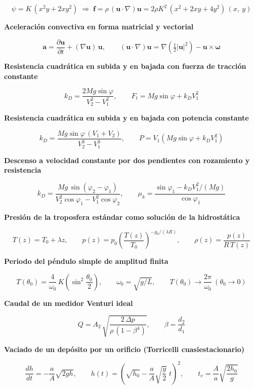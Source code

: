 \documentclass[10pt,openany]{book}
\begin{document}
\[
\psi = K\,(x^{2}y + 2xy^{2}) \;\Rightarrow\; \mathbf{f} = \rho\,(\mathbf{u}\cdot\nabla)\mathbf{u} = 2\rho K^{2}\,(x^{2} + 2xy + 4y^{2})\,(x,\ y)
\]

\noindent\textbf{Aceleración convectiva en forma matricial y vectorial}

\[
\mathbf{a} = \frac{\partial\mathbf{u}}{\partial t} + (\nabla\mathbf{u})\,\mathbf{u},\qquad (\mathbf{u}\cdot\nabla)\mathbf{u} = \nabla\!\left(\tfrac12|\mathbf{u}|^{2}\right) - \mathbf{u}\times\boldsymbol{\omega}
\]

\noindent\textbf{Resistencia cuadrática en subida y en bajada con fuerza de tracción constante}

\[
k_D = \frac{2Mg\sin\varphi}{V_2^{2} - V_1^{2}},\qquad F_t = Mg\sin\varphi + k_D V_1^{2}
\]

\noindent\textbf{Resistencia cuadrática en subida y en bajada con potencia constante}

\[
k_D = \frac{Mg\sin\varphi\,(V_1 + V_2)}{V_2^{3} - V_1^{3}},\qquad P = V_1\left(Mg\sin\varphi + k_D V_1^{2}\right)
\]

\noindent\textbf{Descenso a velocidad constante por dos pendientes con rozamiento y resistencia}

\[
k_D = \frac{Mg\,\sin(\varphi_2 - \varphi_1)}{V_2^{2}\cos\varphi_1 - V_1^{2}\cos\varphi_2},\qquad \mu_k = \frac{\sin\varphi_1 - k_D V_1^{2}/(Mg)}{\cos\varphi_1}
\]

\noindent\textbf{Presión de la troposfera estándar como solución de la hidrostática}

\[
T(z) = T_0 + \lambda z,\qquad p(z) = p_0\left(\frac{T(z)}{T_0}\right)^{-g_0/(\lambda R)},\qquad \rho(z) = \frac{p(z)}{R\,T(z)}
\]

\noindent\textbf{Periodo del péndulo simple de amplitud finita}

\[
T(\theta_0) = \frac{4}{\omega_0}\,K\!\left(\sin^{2}\frac{\theta_0}{2}\right),\qquad \omega_0 = \sqrt{g/L},\qquad T(\theta_0) \to \frac{2\pi}{\omega_0}\ (\theta_0 \to 0)
\]

\noindent\textbf{Caudal de un medidor Venturi ideal}

\[
Q = A_2\,\sqrt{\frac{2\,\Delta p}{\rho\,(1 - \beta^{4})}},\qquad \beta = \frac{d_2}{d_1}
\]

\noindent\textbf{Vaciado de un depósito por un orificio (Torricelli cuasiestacionario)}

\[
\frac{dh}{dt} = -\frac{a}{A}\sqrt{2gh},\qquad h(t) = \left(\sqrt{h_0} - \frac{a}{A}\sqrt{\frac{g}{2}}\;t\right)^{2},\qquad t_v = \frac{A}{a}\sqrt{\frac{2h_0}{g}}
\]
\end{document}
